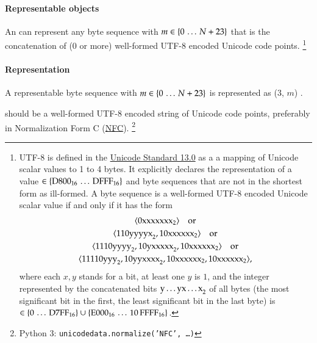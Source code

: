 \paragraph{Representable objects}

An \DborUtfEightStringValue{} can represent any byte sequence 
with $m \in \{0 \,\ldots\, N + 23\}$ that is the concatenation of ($0$ or more)
well-formed UTF-8 encoded Unicode code points.%
\footnote{
    UTF-8 is defined in the
    \href{https://www.unicode.org/versions/Unicode13.0.0/ch03.pdf\#G31703}{Unicode Standard 13.0}
    as a a mapping of Unicode scalar values to 1 to 4 bytes.
    It explicitly declares the representation of a value $\in \{\mathrm{D800}_{16} \,\ldots\, \mathrm{DFFF}_{16}\}$
    and byte sequences that are not in the shortest form as ill-formed.
    A byte sequence  is a well-formed UTF-8 encoded Unicode scalar value if and
    only if it has the form
    \begin{gather*}
        \langle \mathrm{0xxxxxxx}_{2} \rangle \quad\text{or} \\
        \langle \mathrm{110yyyyx}_{2}, \mathrm{10xxxxxx}_{2} \rangle \quad\text{or} \\
        \langle \mathrm{1110yyyy}_{2}, \mathrm{10yxxxxx}_{2}, \mathrm{10xxxxxx}_{2} \rangle \quad\text{or} \\
        \langle \mathrm{11110yyy}_{2}, \mathrm{10yyxxxx}_{2}, \mathrm{10xxxxxx}_{2}, \mathrm{10xxxxxx}_{2} \rangle,
    \end{gather*}
    where each $x, y$ stands for a bit, at least one $y$ is $1$, and the integer represented by
    the concatenated bits $\mathrm{y \ldots y x \ldots x}_{2}$ of all bytes
    (the most significant bit in the first, the least significant bit in the last byte) is
    $\in \{0 \,\ldots\, \mathrm{D7FF}_{16}\} \cup \{\mathrm{E000}_{16} \,\ldots\, \mathrm{10\,FFFF}_{16}\}$.
}

\paragraph{Representation}

A representable byte sequence  with $m \in \{0 \,\ldots\, N + 23\}$
is represented as \DborIntegerToken*($3$, $m$) {\Concat} .

 should be a well-formed UTF-8 encoded string of Unicode code points,
preferably in Normalization Form C (\href{https://www.unicode.org/versions/Unicode13.0.0/ch03.pdf\#G31703}{NFC}).%
\footnote{
    Python 3: \texttt{unicodedata.normalize('NFC', \dots)}
}

